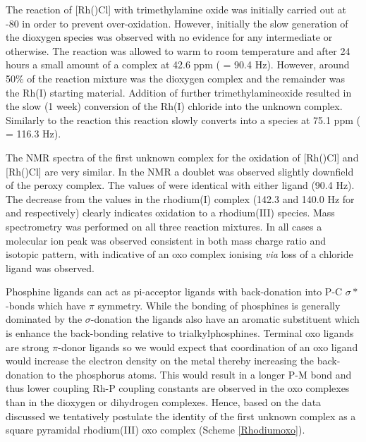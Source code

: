 The reaction of [Rh(\tBuxantphos)Cl] with trimethylamine oxide was initially carried out at -80 \degC{} in order to prevent over-oxidation.  However, initially the slow generation of the dioxygen species was observed with no evidence for any intermediate or otherwise.  The reaction was allowed to warm to room temperature and after 24 hours a small amount of a complex at 42.6 ppm (\JRhP{} = 90.4 Hz).  However, around 50\%{} of the reaction mixture was the dioxygen complex and the remainder was the Rh(I) starting material.  Addition of further trimethylamineoxide resulted in the slow (1 week) conversion of the Rh(I) chloride into the unknown complex.  Similarly to the \tButhixantphos{} reaction this reaction slowly converts into a species at 75.1 ppm (\JRhP{} = 116.3 Hz).  

The NMR spectra of the first unknown complex for the oxidation of [Rh(\tBuxantphos)Cl] and [Rh(\tButhixantphos)Cl] are very similar.  In the \phosphorus{} NMR a doublet was observed slightly downfield of the peroxy complex.  The values of \JRhP{} were identical with either ligand (90.4 Hz).  The decrease from the values in the rhodium(I) complex (142.3 and 140.0 Hz for \tBuxantphos{} and \tButhixantphos{} respectively) clearly indicates oxidation to a rhodium(III) species.    Mass spectrometry was performed on all three reaction mixtures.  In all cases a molecular ion peak was observed consistent in both mass charge ratio and isotopic pattern, with indicative of an oxo complex ionising \emph{via} loss of a chloride ligand was observed.

Phosphine ligands can act as pi-acceptor ligands with back-donation into P-C $\sigma*$-bonds which have $\pi$ symmetry.  While the bonding of \tBu{} phosphines is generally dominated by the $\sigma$-donation the \tBuxantphos{} ligands also have an aromatic substituent which is enhance the back-bonding relative to trialkylphosphines.  Terminal oxo ligands are strong $\pi$-donor ligands\cite{Betley2008} so we would expect that coordination of an oxo ligand would increase the electron density on the metal thereby increasing the back-donation to the phosphorus atoms.  This would result in a longer P-M bond and thus lower coupling Rh-P coupling constants are observed in the oxo complexes than in the dioxygen or dihydrogen complexes.  Hence, based on the data discussed we tentatively postulate the identity of the first unknown complex as a square pyramidal rhodium(III) oxo complex (Scheme \ref{Rhodiumoxo}).


